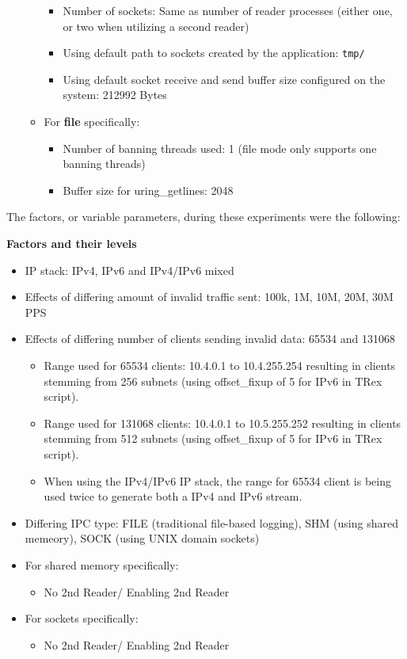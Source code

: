 \begin{itemize}
\begin{itemize}
\begin{itemize}
            \item Number of sockets\@: Same as number of reader processes (either one, or two when utilizing a second reader)
            \item Using default path to sockets created by the application\@: \texttt{tmp/}
            \item Using default socket receive and send buffer size configured on the system\@: 212992 Bytes
        \end{itemize}
        \item For \textbf{file} specifically\@:
        \begin{itemize}
            \item Number of banning threads used\@: 1 (file mode only supports one banning threads)
            \item Buffer size for uring\_getlines\@: 2048
        \end{itemize}
    \end{itemize}
\end{itemize}

\bigskip
\noindent
The factors, or variable parameters, during these experiments were the following\@:

\bigskip
\noindent
\textbf{Factors and their levels}
\begin{itemize}
    \item \ac{IP} stack: IPv4, IPv6 and IPv4/IPv6 mixed
    \item Effects of differing amount of invalid traffic sent: 100k, 1M, 10M, 20M, 30M \ac{PPS}
    \item Effects of differing number of clients sending invalid data: 65534 and 131068
    \begin{itemize}
        \item Range used for 65534 clients: 10.4.0.1 to 10.4.255.254 resulting in clients stemming from 256 subnets (using offset\_fixup of 5 for IPv6 in TRex script).
        \item Range used for 131068 clients: 10.4.0.1 to 10.5.255.252 resulting in clients stemming from 512 subnets (using offset\_fixup of 5 for IPv6 in TRex script).
        \item When using the IPv4/IPv6 \ac{IP} stack, the range for 65534 client is being used twice to generate both a IPv4 and IPv6 stream.
    \end{itemize}
    \item Differing \ac{IPC} type\@: FILE (traditional file-based logging), SHM (using shared memeory), SOCK (using UNIX domain sockets)
    \item For shared memory specifically:
    \begin{itemize}
        \item No 2nd Reader/ Enabling 2nd Reader
    \end{itemize}
    \item For sockets specifically:
    \begin{itemize}
        \item No 2nd Reader/ Enabling 2nd Reader
    \end{itemize}
\end{itemize}

